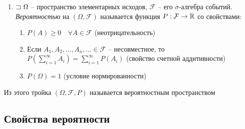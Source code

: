 \documentclass[12pt]{article}
\begin{document}
\begin{enumerate}
\begin{enumerate}
            \item $A, B \in \mathcal{F} \Longrightarrow A \setminus B \in \mathcal{F}$

            \begin{tcolorbox}
                $\Box \quad$ $A, B \in \mathcal{F} \Longrightarrow A, \overline{B} \in \mathcal{F} \Longrightarrow A \setminus B = A \cdot \overline{B} \in \mathcal{F}$ $\quad \Box$
            \end{tcolorbox}

        \end{enumerate}

         $\mathcal{F} = \{\emptyset, \Omega\}$

         $\mathcal{F} = \{\emptyset, \Omega, A, \overline{A}\}$

         \Defs Борелевская $\sigma$-алгебра $\mathcal{B}(\Real)$ -- минимальная $\sigma$-алгебра, содержащая все возможные интервалы на прямой


        \item \Defs $\mathord{\sqsupset}\ \Omega$ -- пространство элементарных исходов, $\mathcal{F}$ -- его $\sigma$-алгебра событий.
        \textit{Вероятностью} на $(\Omega, \mathcal{F})$ называется функция $P: \mathcal{F} \to \mathbb{R}$ со свойствами:

        \begin{enumerate}
            \item $P(A) \geq 0 \quad \forall A \in \mathcal{F}$ (неотрицательность)

            \item Если $A_1, A_2, \dots, A_n, \dots \in \mathcal{F}$ -- несовместное, то $P(\sum_{i = 1}^\infty A_i) = \sum_{i = 1}^\infty P(A_i)$ (свойство счетной аддитивности)

            \item $P(\Omega) = 1$ (условие нормированности)
        \end{enumerate}

    \end{enumerate}

    \hypertarget{probabilityspace}{}

    \Def Из этого тройка $(\Omega, \mathcal{F}, P)$ называется вероятностным пространством

    \subsection{Свойства вероятности}
\end{document}
